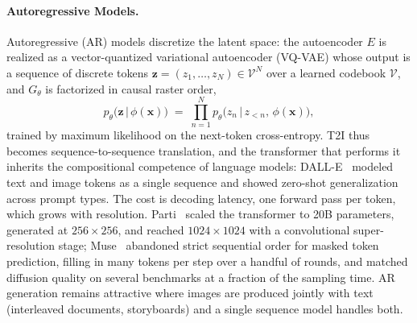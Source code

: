 \paragraph{Autoregressive Models.}\label{para:p3_s8_1_1_ar}
Autoregressive (AR) models discretize the latent space: the autoencoder $E$ is realized as a vector-quantized variational autoencoder (VQ-VAE) whose output is a sequence of discrete tokens $\mathbf{z}=(z_1,\dots,z_N)\in\mathcal{V}^N$ over a learned codebook $\mathcal{V}$, and $G_\theta$ is factorized in causal raster order,
\begin{equation}
p_\theta\!\big(\mathbf{z}\,\big|\,\phi(\mathbf{x})\big) \;=\; \prod_{n=1}^{N} p_\theta\!\big(z_n\,\big|\,z_{<n},\,\phi(\mathbf{x})\big),
\label{eq:t2i_ar_factorisation}
\end{equation}
trained by maximum likelihood on the next-token cross-entropy.
T2I thus becomes sequence-to-sequence translation, and the transformer that performs it inherits the compositional competence of language models: DALL-E~\cite{dalle2021} modeled text and image tokens as a single sequence and showed zero-shot generalization across prompt types.
The cost is decoding latency, one forward pass per token, which grows with resolution.
Parti~\cite{parti2022} scaled the transformer to 20B parameters, generated at $256\times256$, and reached $1024\times1024$ with a convolutional super-resolution stage; Muse~\cite{chang2023muse} abandoned strict sequential order for masked token prediction, filling in many tokens per step over a handful of rounds, and matched diffusion quality on several benchmarks at a fraction of the sampling time.
AR generation remains attractive where images are produced jointly with text (interleaved documents, storyboards) and a single sequence model handles both.

